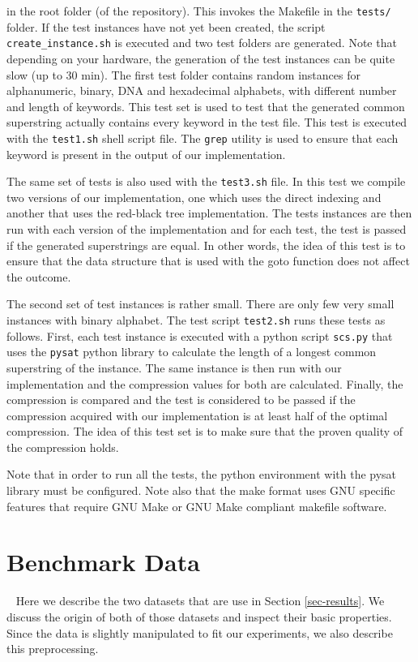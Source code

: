 \documentclass[english,twoside,censored,csm,algorithms-track-2020]{HYthesisML}
\theoremstyle{plain}
\theoremstyle{definition}
\begin{document}
in the root folder (of the repository). This invokes the Makefile in the \texttt{tests/} folder. If the
test instances have not yet been created, the script \texttt{create\_instance.sh} is executed and two
test folders are generated. Note that depending on your hardware, the generation of the test instances
can be quite slow (up to 30 min).
The first test folder contains random instances for alphanumeric, binary,
DNA and hexadecimal alphabets, with different number and length of keywords. This test set is used
to test that the generated common superstring actually contains every keyword in the test file. This
test is executed with the \texttt{test1.sh} shell script file. The \texttt{grep} utility is used to ensure
that each keyword is present in the output of our implementation. 

The same set of tests is also used with the \texttt{test3.sh} file. In this test we compile two versions
of our implementation, one which uses the direct indexing and another that uses the red-black tree
implementation. The tests instances are then run with each version of the implementation and for each
test, the test is passed if the generated superstrings are equal. In other words, the idea of this
test is to ensure that the data structure that is used with the goto function does not affect
the outcome.

The second set of test instances is rather small. There are only few very small instances with binary
alphabet. The test script \texttt{test2.sh} runs these tests as follows. First, each test instance is
executed with a python script \texttt{scs.py} that uses the \texttt{pysat} python library to calculate
the length of a longest common superstring of the instance. The same instance is then run with our
implementation and the compression values for both are calculated. Finally, the compression is compared
and the test is considered to be passed if the compression acquired with our implementation is
at least half of the optimal compression. The idea of this test set is to make sure that the proven
quality of the compression holds.

Note that in order to run all the tests, the python environment with the pysat library must be configured.
Note also that the make format uses GNU specific features that require GNU Make or GNU Make compliant
makefile software. 



\section{Benchmark Data}~\label{data}
Here we describe the two datasets that are use in Section \ref{sec-results}. We discuss the origin
of both of those datasets and inspect their basic properties. Since the data is slightly manipulated
to fit our experiments, we also describe this preprocessing.
\end{document}

